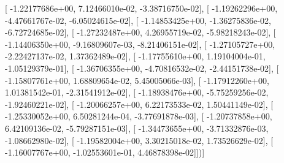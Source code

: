 \documentclass{article}
\begin{document}
       [ -1.22177686e+00,   7.12466010e-02,  -3.38716750e-02],
       [ -1.19262296e+00,  -4.47661767e-02,  -6.05024615e-02],
       [ -1.14853425e+00,  -1.36275836e-02,  -6.72724685e-02],
       [ -1.27232487e+00,   4.26955719e-02,  -5.98218243e-02],
       [ -1.14406350e+00,  -9.16809607e-03,  -8.21406151e-02],
       [ -1.27105727e+00,  -2.22427137e-02,   1.37362489e-02],
       [ -1.17755610e+00,   1.19104004e-01,  -1.05129379e-01],
       [ -1.36706355e+00,  -4.70816532e-02,  -2.44151738e-02],
       [ -1.15807761e+00,   1.68809654e-02,   5.45005066e-03],
       [ -1.17912260e+00,   1.01381542e-01,  -2.31541912e-02],
       [ -1.18938476e+00,  -5.75259256e-02,  -1.92460221e-02],
       [ -1.20066257e+00,   6.22173533e-02,   1.50441149e-02],
       [ -1.25330052e+00,   6.50281244e-04,  -3.77691878e-03],
       [ -1.20737858e+00,   6.42109136e-02,  -5.79287151e-03],
       [ -1.34473655e+00,  -3.71332876e-03,  -1.08662980e-02],
       [ -1.19582004e+00,   3.30215018e-02,   1.73526629e-02],
       [ -1.16007767e+00,  -1.02553601e-01,   4.46878398e-02]])]
\end{document}
